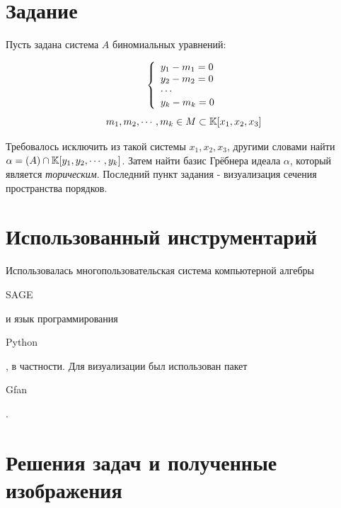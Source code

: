 



\maketitle
\thispagestyle{empty}

\section{Задание}

Пусть задана система $ A $ биномиальных уравнений:

\[
\left\{ 
\begin{array}{l l}
  y_1 - m_1 = 0 \\
  y_2 - m_2 = 0 \\
  \cdots \\
  y_k - m_k = 0
\end{array} \right.
\]
\[m_1, m_2, \cdots, m_k \in M \subset \mathbb{K}[x_1, x_2, x_3]\]

Требовалось исключить из такой системы $ x_1, x_2, x_3 $, другими словами 
найти $ \mathfrak{\alpha} = (A) \cap \mathbb{K}[y_1, y_2, \cdots, y_k] $. Затем
найти базис Грёбнера идеала $ \alpha $, который является \emph{торическим}. Последний пункт задания - визуализация
сечения пространства порядков.

\section{Использованный инструментарий}

Использовалась многопользовательская система компьютерной алгебры \begin{tt}SAGE\end{tt} и язык программирования \begin{tt}Python\end{tt}, в частности. Для визуализации был использован пакет \begin{tt}Gfan\end{tt}. 

\newpage

\section{Решения задач и полученные изображения}

